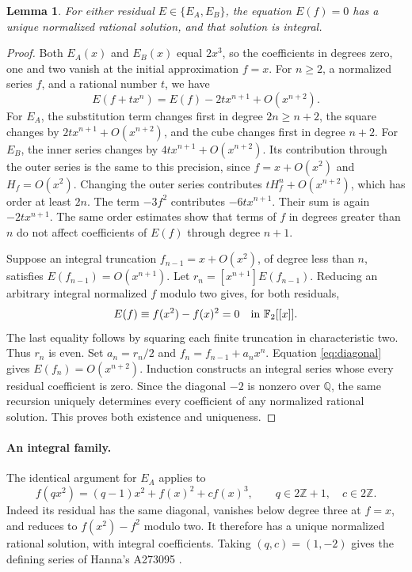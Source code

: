 \documentclass[11pt]{article}
\newtheorem{lemma}[theorem]{Lemma}
\newcommand{\Z}{\mathbb Z}
\newcommand{\Q}{\mathbb Q}
\newcommand{\Fp}{\mathbb F}
\newcommand{\coef}[2]{[x^{#1}]#2}
\begin{document}
\begin{lemma}\label{lem:lift}
For either residual $E\in\{E_A,E_B\}$, the equation $E(f)=0$ has a
unique normalized rational solution, and that solution is integral.
\end{lemma}
\begin{proof}
Both $E_A(x)$ and $E_B(x)$ equal $2x^3$, so the coefficients in degrees
zero, one and two vanish at the initial approximation $f=x$.
For $n\geq2$, a normalized series $f$, and a rational number $t$, we have
\begin{equation}\label{eq:diagonal}
 E(f+t x^n)=E(f)-2t x^{n+1}+O(x^{n+2}).
\end{equation}
For $E_A$, the substitution term changes first in degree $2n\geq n+2$,
the square changes by $2t x^{n+1}+O(x^{n+2})$, and the cube changes
first in degree $n+2$.
For $E_B$, the inner series changes by
$4t x^{n+1}+O(x^{n+2})$. Its contribution through the outer series
is the same to this precision, since $f=x+O(x^2)$ and $H_f=O(x^2)$.
Changing the outer series contributes $tH_f^n+O(x^{n+2})$, which has
order at least $2n$. The term $-3f^2$ contributes $-6t x^{n+1}$.
Their sum is again $-2t x^{n+1}$.
The same order estimates show that terms of $f$ in degrees greater than
$n$ do not affect coefficients of $E(f)$ through degree $n+1$.

Suppose an integral truncation $f_{n-1}=x+O(x^2)$, of degree less than
$n$, satisfies $E(f_{n-1})=O(x^{n+1})$.
Let $r_n=\coef{n+1}{E(f_{n-1})}$. Reducing an arbitrary integral
normalized $f$ modulo two gives, for both residuals,
\[
 E(f)\equiv f(x^2)-f(x)^2=0\quad\hbox{in }\Fp_2[[x]].
\]
The last equality follows by squaring each finite truncation in
characteristic two. Thus $r_n$ is even. Set $a_n=r_n/2$ and
$f_n=f_{n-1}+a_nx^n$. Equation \eqref{eq:diagonal} gives
$E(f_n)=O(x^{n+2})$. Induction constructs an integral series whose every
residual coefficient is zero. Since the diagonal $-2$ is nonzero over
$\Q$, the same recursion uniquely determines every coefficient of any
normalized rational solution. This proves both existence and uniqueness.
\end{proof}

\paragraph{An integral family.}
The identical argument for $E_A$ applies to
\begin{equation}\label{eq:family}
 f(qx^2)=(q-1)x^2+f(x)^2+c f(x)^3,
 \qquad q\in2\Z+1,\quad c\in2\Z.
\end{equation}
Indeed its residual has the same diagonal, vanishes below degree three
at $f=x$, and reduces to $f(x^2)-f^2$ modulo two.
It therefore has a unique normalized rational solution, with integral
coefficients. Taking $(q,c)=(1,-2)$ gives the defining series of
Hanna's A273095 \cite{hanna095}.
\end{document}
